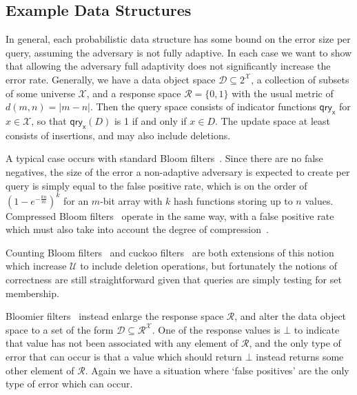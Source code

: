 \subsection{Example Data Structures}

In general, each probabilistic data structure has some bound on the error size per query, assuming the adversary is not fully adaptive. In each case we want to show that allowing the adversary full adaptivity does not significantly increase the error rate. Generally, we have a data object space $\mathcal{D} \subseteq 2^\mathcal{X}$, a collection of subsets of some universe $\mathcal{X}$, and a response space $\mathcal{R} = \{0,1\}$ with the usual metric of $d(m,n) = |m-n|$. Then the query space consists of indicator functions $\mathsf{qry_x}$ for $x \in \mathcal{X}$, so that $\mathsf{qry_x}(D)$ is 1 if and only if $x \in D$. The update space at least consists of insertions, and may also include deletions.

A typical case occurs with standard Bloom filters~\cite{bloomfilter}. Since there are no false negatives, the size of the error a non-adaptive adversary is expected to create per query is simply equal to the false positive rate, which is on the order of $(1-e^{-\frac{kn}{m}})^k$ for an $m$-bit array with $k$ hash functions storing up to $n$ values. Compressed Bloom filters~\cite{xxx} operate in the same way, with a false positive rate which must also take into account the degree of compression~. 

Counting Bloom filters~\cite{xxx} and cuckoo filters~\cite{xxx} are both extensions of this notion which increase $\mathcal{U}$ to include deletion operations, but fortunately the notions of correctness are still straightforward given that queries are simply testing for set membership.   

Bloomier filters~\cite{xxx} instead enlarge the response space $\mathcal{R}$, and alter the data object space to a set of the form $\mathcal{D} \subseteq \mathcal{R}^\mathcal{X}$.  One of the response values is $\bot$ to indicate that value has not been associated with any element of $\mathcal{R}$, and the only type of error that can occur is that a value which should return $\bot$ instead returns some other element of $\mathcal{R}$. Again we have a situation where `false positives' are the only type of error which can occur.

